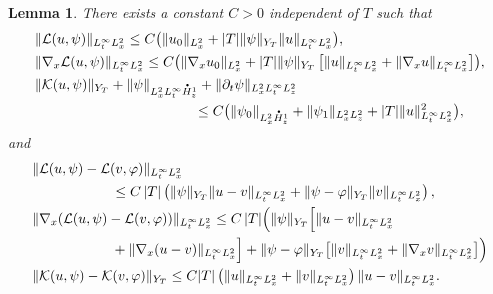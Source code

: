 \documentclass[10pt]{amsart}
\newtheorem{lemma}{Lemma}[section]
\theoremstyle{definition}
\newcommand*{\overbigdot}[1]{%
\accentset{\mbox{\large\bfseries .}}{#1}}
\let\ds\displaystyle
\begin{document}
\begin{lemma}\label{lemma_TC1}
There exists a constant $C>0$ independent of $T$ such that
\begin{subequations}
\begin{align}
\label{estimate_strichartz_1} &\ds\|\mathcal{L}(u,\psi)\|_{L_{t}^{\infty}L_{x}^{2}} \leq  C\bigl(\|u_{0}\|_{L_{x}^{2}}+|T|\|\psi\|_{Y_{T}}\|u\|_{L_{t}^{\infty}L_{x}^{2}}\bigr),\\
\label{estimate_strichartz_2} &\ds\|\nabla_{x}\mathcal{L}(u,\psi)\|_{L_{t}^{\infty}L_{x}^{2}} \leq  C\bigl(\|\nabla_{x}u_{0}\|_{L_{x}^{2}}+|T|\|\psi\|_{Y_{T}}\left[\|u\|_{L_{t}^{\infty}L_{x}^{2}}+\|\nabla_{x}u\|_{L_{t}^{\infty}L_{x}^{2}}\right]\bigr),\\
\label{estimate_strichartz_3}&
\|\mathcal{K}(u,\psi)\|_{Y_{T}}+\|\psi\|_{L_{x}^{2}L_{t}^{\infty}\overbigdot{H}_{z}^{1}}+\|\partial_{t}\psi\|_{L_{x}^{2}L_{t}^{\infty}L_{z}^{2}}\\
&\hspace*{4cm}\leq C\bigl(\|\psi_{0}\|_{L_{x}^{2}\overbigdot{H}_{z}^{1}}+\|\psi_{1}\|_{L_{x}^{2}L_{z}^{2}}+|T|\|u\|_{L_{t}^{\infty}L_{x}^{2}}^{2}\bigr),\notag
\end{align}
\end{subequations}
and
\begin{subequations}
\begin{align}
\label{estimate_strichartz_4} &\|\mathcal{L}(u,\psi)-\mathcal{L}(v,\varphi)\|_{L_{t}^{\infty}L_{x}^{2}}\\
&\hspace*{2cm}\leq  C\,|T|\left(\|\psi\|_{Y_{T}}\|u-v\|_{L_{t}^{\infty}L_{x}^{2}}+\|\psi-\varphi\|_{Y_{T}}\|v\|_{L_{t}^{\infty}L_{x}^{2}}\right),\notag\\
\label{estimate_strichartz_5}&
\|\nabla_{x}(\mathcal{L}(u,\psi)-\mathcal{L}(v,\varphi))\|_{L_{t}^{\infty}L_{x}^{2}} \leq  C\,|T|\Bigl(\|\psi\|_{Y_{T}}\Bigl[\|u-v\|_{L_{t}^{\infty}L_{x}^{2}}\\
&\hspace*{2cm}+\|\nabla_{x}(u-v)\|_{L_{t}^{\infty}L_{x}^{2}} \Bigr]+\|\psi-\varphi\|_{Y_{T}}\bigl[\|v\|_{L_{t}^{\infty}L_{x}^{2}}+\|\nabla_{x}v\|_{L_{t}^{\infty}L_{x}^{2}}\bigr]\Bigr)\notag
\\
\label{estimate_strichartz_6}
&\|\mathcal{K}(u,\psi)-\mathcal{K}(v,\varphi)\|_{Y_{T}} \leq  C|T|\left(\|u\|_{L_{t}^{\infty}L_{x}^{2}}+\|v\|_{L_{t}^{\infty}L_{x}^{2}}\right)\|u-v\|_{L_{t}^{\infty}L_{x}^{2}}.
\end{align}
\end{subequations}
\end{lemma}
\end{document}
